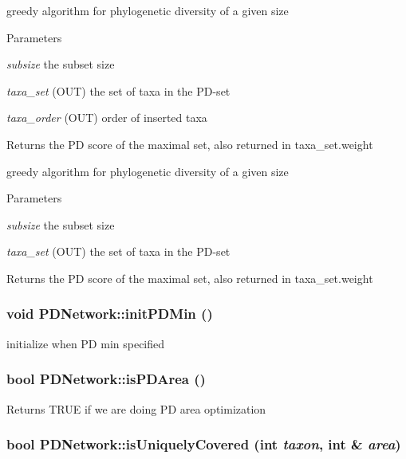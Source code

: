 \label{classPDNetwork_a45e8597bb2a7f8829b2560c613a10497}
greedy algorithm for phylogenetic diversity of a given size 
\begin{DoxyParams}{Parameters}
\item[{\em subsize}]the subset size \item[{\em taxa\_\-set}](OUT) the set of taxa in the PD-\/set \item[{\em taxa\_\-order}](OUT) order of inserted taxa \end{DoxyParams}
\begin{DoxyReturn}{Returns}
the PD score of the maximal set, also returned in taxa\_\-set.weight
\end{DoxyReturn}
greedy algorithm for phylogenetic diversity of a given size 
\begin{DoxyParams}{Parameters}
\item[{\em subsize}]the subset size \item[{\em taxa\_\-set}](OUT) the set of taxa in the PD-\/set \end{DoxyParams}
\begin{DoxyReturn}{Returns}
the PD score of the maximal set, also returned in taxa\_\-set.weight 
\end{DoxyReturn}
\hypertarget{classPDNetwork_ae7dc55bf1b3d05baa5ee85f58709ccc3}{
\subsubsection[{initPDMin}]{\setlength{\rightskip}{0pt plus 5cm}void PDNetwork::initPDMin ()}}
\label{classPDNetwork_ae7dc55bf1b3d05baa5ee85f58709ccc3}
initialize when PD min specified \hypertarget{classPDNetwork_a4b01aead98ff4ffc2f4ad1b020ffaa39}{
\subsubsection[{isPDArea}]{\setlength{\rightskip}{0pt plus 5cm}bool PDNetwork::isPDArea ()}}
\label{classPDNetwork_a4b01aead98ff4ffc2f4ad1b020ffaa39}
\begin{DoxyReturn}{Returns}
TRUE if we are doing PD area optimization 
\end{DoxyReturn}
\hypertarget{classPDNetwork_a89a41e4b180dacd776a0496cb4137080}{
\subsubsection[{isUniquelyCovered}]{\setlength{\rightskip}{0pt plus 5cm}bool PDNetwork::isUniquelyCovered (int {\em taxon}, \/  int \& {\em area})}}
